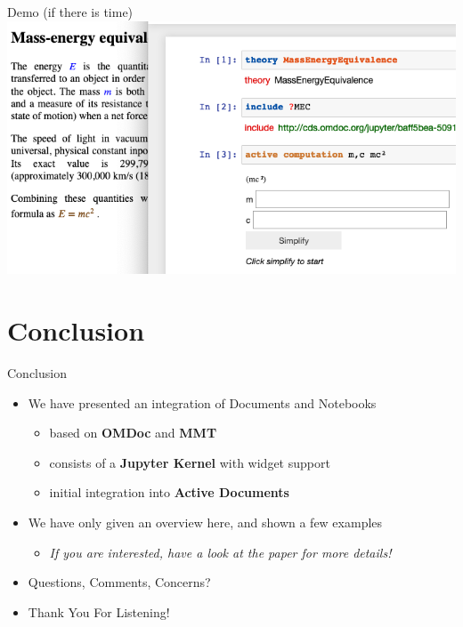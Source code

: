 \documentclass{beamer}
\begin{document}
    \begin{frame}[fragile]{Demo (if there is time) }
        \includegraphics[scale=0.5]{images/acwidget}
    \end{frame}


    \section{Conclusion}

    \begin{frame}{Conclusion}
        \begin{itemize}
            \item We have presented an integration of Documents and Notebooks
            \begin{itemize}
                \item based on \textbf{OMDoc} and \textbf{MMT}
                \item consists of a \textbf{Jupyter Kernel} with widget support
                \item initial integration into \textbf{Active Documents}
            \end{itemize}

            \item We have only given an overview here, and shown a few examples
            \begin{itemize}
                \item \textit{If you are interested, have a look at the paper for more details!}
            \end{itemize}

            \item Questions, Comments, Concerns?

            \item Thank You For Listening!

            \vspace{2em}


        \end{itemize}
    \end{frame}
\end{document}
